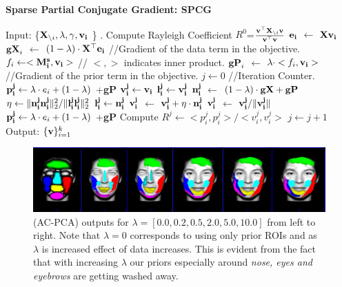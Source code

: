 \documentclass{llncs}
\begin{document}
\begin{algorithm}[htdp]
\small \caption{\bf Sparse Partial Conjugate Gradient: SPCG}
\label{algo2}
\begin{algorithmic}[1]
\STATE Input:  \{${\bf X}_{\backslash i},\lambda,\gamma, {\bf v_i}$ \} .
\STATE Compute Rayleigh Coefficient $R^0$=$\frac{{\bf v}^{\top}{\bf X}_{\backslash i}{\bf v}}{{\bf v}^{\top}{\bf v}}$
\STATE ${\bf e_i}$ $\gets$ ${\bf X}{\bf v_i}$ 
\STATE ${\bf gX}_i$ $\gets$ $(1-\lambda)\cdot{\bf X^{\top}e_i}$  //Gradient of the data term in the objective.
\STATE $f_i  \gets  <{\bf M^s_i, \bf v_i}>$ // $<,>$ indicates inner product.
\STATE ${\bf gP}_i$ $\gets$ $\lambda\cdot <f_i,{\bf v_i}>$   //Gradient of the prior term in the objective.
\STATE $j \gets 0$ //Iteration Counter.
\STATE ${\bf p_i^j} \gets \lambda\cdot e_i + (1-\lambda)$ +{\bf gP}
\STATE ${\bf v_i^j} \gets {\bf v_i}$
\STATE ${\bf l_i^j} \gets {\bf v_i^j}$
\STATE ${\bf n_i^{j}}$ $\gets$ $(1-\lambda)\cdot {\bf gX} + {\bf gP}$
\STATE $\eta \gets  \|{\bf n_i^{j}}{\bf n_i^{j}}\|_2^2 / \|{\bf l_i^j}{\bf l_i^j}\|_2^2$
\STATE ${\bf l_i^j} \gets {\bf n_i^j}$
\STATE ${\bf v_i^{j}}$ $\gets$ $ {\bf v_i^{j}} + \eta\cdot {\bf n_i^{j}}$
\STATE  ${\bf v_i^j}$ $\gets$ ${\bf v_i^j}/\|{\bf v_i^j}\|$
\STATE ${\bf p_i^j} \gets \lambda\cdot e_i + (1-\lambda)$ +{\bf gP}
\STATE Compute $R^j \gets <p_i^j,p_i^j>/<v_i^j,v_i^j>$ 
\STATE $j \gets j+1$
\ENDWHILE
\STATE Output:  $\{{\bf v}\}_{i=1}^{k}$
\end{algorithmic}
\end{algorithm}





\iffalse
\begin{figure}
\begin{center}
\includegraphics[width=\linewidth]{fig2.pdf} 
\end{center}
\vspace{-0.2in}
\caption{(AC-PCA) outputs for $\lambda=[0.0,0.2,0.5,2.0,5.0,10.0]$ from left to right. Note that $\lambda =0$ corresponds to using only prior ROIs and as $\lambda$ is increased effect of data increases. This is evident from the fact that with increasing $\lambda$ our priors especially around {\em nose, eyes and eyebrows} are getting washed away.}
\label{fig:priorvary}
\end{figure}
\end{document}
